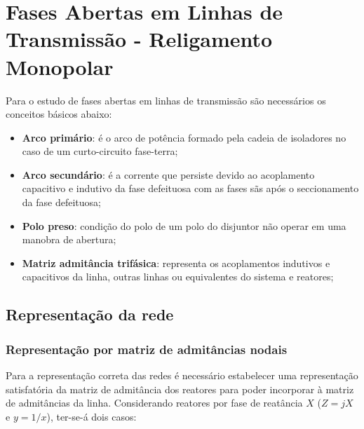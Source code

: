\section{Fases Abertas em Linhas de Transmissão - Religamento Monopolar}

Para o estudo de fases abertas em linhas de transmissão são necessários os conceitos básicos abaixo:

\begin{itemize}
    \item \textbf{Arco primário}: é o arco de potência formado pela cadeia de isoladores no caso de um curto-circuito fase-terra;
    \item \textbf{Arco secundário}: é a corrente que persiste devido ao acoplamento capacitivo e indutivo da fase defeituosa com as fases sãs após o seccionamento da fase defeituosa;
    \item \textbf{Polo preso}: condição do polo de um polo do disjuntor não operar em uma manobra de abertura;
    \item \textbf{Matriz admitância trifásica}: representa os acoplamentos indutivos e capacitivos da linha, outras linhas ou equivalentes do sistema e reatores;
\end{itemize}

\subsection{Representação da rede}
\subsubsection{Representação por matriz de admitâncias nodais}

Para a representação correta das redes é necessário estabelecer uma representação satisfatória da matriz de admitância dos reatores para poder incorporar à matriz de admitâncias da linha. Considerando reatores por fase de reatância $X$ ($Z = jX$ e $y = 1/x$), ter-se-á dois casos:


